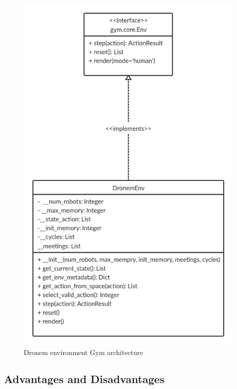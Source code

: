 \begin{figure}[!htb]
    \centering
    \includegraphics[scale=0.2]{Figures/gymEnvArchitecture.jpg}
    \caption{Dronem environment Gym architecture}
    \label{fig:dronemEnvGym}
\end{figure}{}


\subsection{Advantages and Disadvantages}

